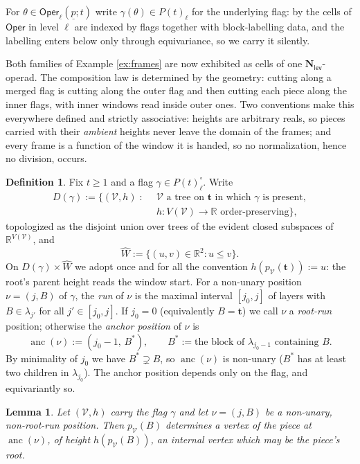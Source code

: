 \documentclass[12pt]{amsart}
\newtheorem{lemma}[subsection]{Lemma}
\theoremstyle{definition}
\newtheorem{definition}[subsection]{Definition}
\theoremstyle{remark}
\newcommand{\Oper}{\mathsf{Oper}}
\newcommand{\Cal}[1]{\mathcal{#1}}
\newcommand{\Nl}{\mathbf{N}_{\mathsf{lev}}}
\newcommand{\anc}{\operatorname{anc}}            %
\newcommand{\Dg}[1]{D(#1)}                       %
\begin{document}
For $\theta\in \Oper_\ell(\underline{p}; t)$ write $\gamma(\theta)\in P(t)_\ell$ for the underlying flag: by \cite[Definition 7.2, Remark 7.3]{Clark-1} the cells of $\Oper$ in level $\ell$ are indexed by flags together with block-labelling data, and the labelling enters below only through equivariance, so we carry it silently.

Both families of Example \ref{ex:frames} are now exhibited as cells of one $\Nl$-operad. The composition law is determined by the geometry: cutting along a merged flag is cutting along the outer flag and then cutting each piece along the inner flags, with inner windows read inside outer ones. Two conventions make this everywhere defined and strictly associative: heights are arbitrary reals, so pieces carried with their \emph{ambient} heights never leave the domain of the frames; and every frame is a function of the window it is handed, so no normalization, hence no division, occurs.

\begin{definition}\label{def:windows}
Fix $t\geq 1$ and a flag $\gamma\in P(t)^{\circ}_{\ell}$. Write
\begin{align*}
 \Dg{\gamma} := \big\{ (\Cal{V}, h) \;:\;\ & \Cal{V} \text{ a tree on } \mathbf{t} \text{ in which } \gamma \text{ is present},\\
 & h\colon V(\Cal{V})\to \mathbb{R} \text{ order-preserving} \big\},
\end{align*}
topologized as the disjoint union over trees of the evident closed subspaces of $\mathbb{R}^{V(\Cal{V})}$, and
\[ \widehat{W} := \{(u,v)\in \mathbb{R}^{2} : u\leq v\}.\]
On $\Dg{\gamma}\times \widehat{W}$ we adopt once and for all the convention $h(p_{\Cal{V}}(\mathbf{t})) := u$: the root's parent height reads the window start. For a non-unary position $\nu = (j,B)$ of $\gamma$, the \emph{run} of $\nu$ is the maximal interval $[j_0, j]$ of layers with $B\in \lambda_{j'}$ for all $j'\in[j_0,j]$. If $j_0 = 0$ (equivalently $B = \mathbf{t}$) we call $\nu$ a \emph{root-run} position; otherwise the \emph{anchor position} of $\nu$ is
\[ \anc(\nu) := (j_0 - 1,\, B^{*}), \quad\quad B^{*} := \text{the block of } \lambda_{j_0-1} \text{ containing } B.\]
By minimality of $j_0$ we have $B^{*}\supsetneq B$, so $\anc(\nu)$ is non-unary ($B^{*}$ has at least two children in $\lambda_{j_0}$). The anchor position depends only on the flag, and equivariantly so.
\end{definition}

\begin{lemma}\label{lem:anc-visible}
Let $(\Cal{V},h)$ carry the flag $\gamma$ and let $\nu = (j,B)$ be a non-unary, non-root-run position. Then $p_{\Cal{V}}(B)$ determines a vertex of the piece at $\anc(\nu)$, of height $h(p_{\Cal{V}}(B))$, an internal vertex which may be the piece's root.
\end{lemma}
\end{document}
